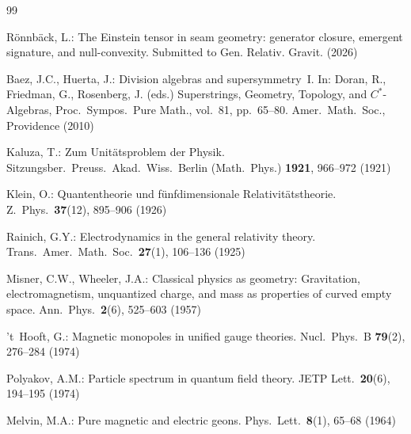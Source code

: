 \documentclass[pdflatex,sn-mathphys-num]{sn-jnl}
\theoremstyle{thmstyleone}%
\theoremstyle{thmstyletwo}%
\theoremstyle{thmstylethree}%
\numberwithin{equation}{section}
\begin{document}
\backmatter

\begin{thebibliography}{99}

R\"onnb\"ack, L.: The Einstein tensor in seam geometry: generator
closure, emergent signature, and null-convexity.
Submitted to Gen. Relativ. Gravit. (2026)

Baez, J.C., Huerta, J.: Division algebras and supersymmetry~I.
 In: Doran, R., Friedman, G., Rosenberg, J. (eds.) Superstrings,
 Geometry, Topology, and $C^*$-Algebras, Proc.\ Sympos.\ Pure
 Math., vol.~81, pp.~65--80. Amer.\ Math.\ Soc., Providence (2010)

Kaluza, T.: Zum Unit\"atsproblem der Physik.
Sitzungsber.\ Preuss.\ Akad.\ Wiss.\ Berlin (Math.\ Phys.)
\textbf{1921}, 966--972 (1921)

Klein, O.: Quantentheorie und f\"unfdimensionale
Relativit\"atstheorie.
Z.\ Phys.\ \textbf{37}(12), 895--906 (1926)

Rainich, G.Y.: Electrodynamics in the general relativity theory.
Trans.\ Amer.\ Math.\ Soc.\ \textbf{27}(1), 106--136 (1925)

Misner, C.W., Wheeler, J.A.: Classical physics as geometry:
Gravitation, electromagnetism, unquantized charge, and mass as
properties of curved empty space.
Ann.\ Phys.\ \textbf{2}(6), 525--603 (1957)

't~Hooft, G.: Magnetic monopoles in unified gauge theories.
Nucl.\ Phys.\ B \textbf{79}(2), 276--284 (1974)

Polyakov, A.M.: Particle spectrum in quantum field theory.
JETP Lett.\ \textbf{20}(6), 194--195 (1974)

Melvin, M.A.: Pure magnetic and electric geons.
Phys.\ Lett.\ \textbf{8}(1), 65--68 (1964)

\end{thebibliography}
\end{document}
